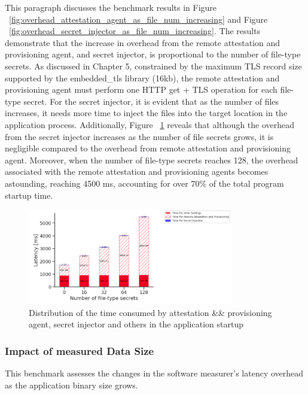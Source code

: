This paragraph discusses the benchmark results in Figure ~\ref{fig:overhead_attestation_agent_as_file_num_increasing} and Figure ~\ref{fig:overhead_secret_injector_as_file_num_increasing}. The results demonstrate that the increase in overhead from the remote attestation and provisioning agent, 
and secret injector, is proportional to the number of file-type secrets. As discussed in Chapter 5, constrained by the maximum TLS record size supported by the embedded\_tls library (16kb), the remote attestation and provisioning 
agent must perform one HTTP get + TLS operation for each file-type secret. For the secret injector, it is evident that as the number of files increases, it needs more time to inject the files into the target location in the application process.  Additionally,
Figure ~\ref{fig:startup_time_change_as_file_type_secret_increasing} reveals that although the overhead from the secret injector increases as the number of file secrets grows, it is negligible compared to the overhead from remote attestation and provisioning agent. Moreover, when the 
number of file-type secrets reaches 128, the overhead associated with the remote attestation and provisioning agents becomes astounding, reaching 4500 ms, accounting for over 70\% of the total program startup time.

\begin{figure}[H]
    \centering
    \includegraphics[width=0.8\textwidth]{images/startup_time_change_as_file_type_secret_increasing.PNG}
    \caption[Distribution of the time consumed by attestation \&\& provisioning agent, secret injector and others in the application startup]{Distribution of the time consumed by attestation \&\& provisioning agent, secret injector and others in the application startup}
    \label{fig:startup_time_change_as_file_type_secret_increasing}
\end{figure}



\subsubsection{Impact of measured Data Size}
This benchmark assesses the changes in the software measurer's latency overhead as the application binary size grows.

